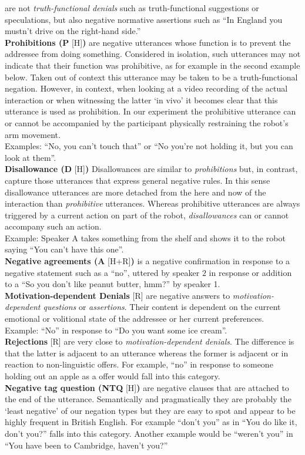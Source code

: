 are not \emph{truth-functional denials} such as truth-functional suggestions or speculations, but also negative normative assertions such as
``In England you mustn't drive on the right-hand side.''\\
\textbf{Prohibitions (P} [H]\textbf{)} are negative utterances whose function is to prevent the addressee from doing something. Considered in isolation, such
utterances may not indicate that their function was prohibitive, as for example in the second example below. Taken out of context this utterance may be taken to
be a truth-functional negation. However, in context, when looking at a video recording of the actual interaction or when witnessing the latter `in vivo' it
becomes clear that this utterance is used as prohibition. In our experiment the prohibitive utterance can or cannot be accompanied by the participant physically
restraining the robot's arm movement.\\
Examples: ``No, you can't touch that'' or ``No you're not holding it, but you can look at them''.\\
\textbf{Disallowance (D} [H]\textbf{)} Disallowances are similar to \emph{prohibitions} but, in contrast, capture those utterances that express general negative
rules. In this sense disallowance utterances are more detached from the here and now of the interaction than \emph{prohibitive} utterances.  Whereas prohibitive
utterances are always triggered by a current action on part of the robot, \emph{disallowances} can or cannot accompany such an action.\\
Example: Speaker A takes something from the shelf and shows it to the robot saying ``You can't have this one''.\\
\textbf{Negative agreements (A} [H+R]\textbf{)} is a negative confirmation in response to a negative statement such as a ``no'', uttered by speaker $2$ in
response or addition to a ``So you don't like peanut butter, hmm?'' by speaker 1.\\
\textbf{Motivation-dependent Denials} [R] are negative answers to \emph{motivation-dependent questions} or \emph{assertions}. Their content is dependent
on the current emotional or volitional state of the addressee or her current preferences.\\
Example: ``No'' in response to ``Do you want some ice cream''.\\
\textbf{Rejections} [R] are very close to \emph{motivation-dependent denials}. The difference is that the latter is adjacent to an utterance whereas the former
is adjacent or in reaction to non-linguistic offers. For example, ``no'' in response to someone holding out an apple as a offer would fall into this category.\\
\textbf{Negative tag question (NTQ} [H]\textbf{)} are negative clauses that are attached to the end of the utterance. Semantically and pragmatically they
are probably the `least negative' of our negation types but they are easy to spot and appear to be highly frequent in British English. For example
``don't you'' as in ``You do like it, don't you?'' falls into this category. Another example would be ``weren't you'' in ``You have been to Cambridge, haven't you?''


